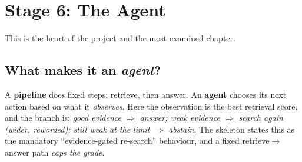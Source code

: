 \chapter{Stage 6: The Agent}\label{ch:agent}
This is the heart of the project and the most examined chapter.
\section{What makes it an \emph{agent}?}
A \textbf{pipeline} does fixed steps: retrieve, then answer. An \textbf{agent} chooses its next action based on what it \emph{observes}. Here the observation is the best retrieval score, and the branch is: \emph{good evidence $\Rightarrow$ answer; weak evidence $\Rightarrow$ search again (wider, reworded); still weak at the limit $\Rightarrow$ abstain}. The skeleton states this as the mandatory ``evidence-gated re-search'' behaviour, and a fixed retrieve$\to$answer path \emph{caps the grade}.

